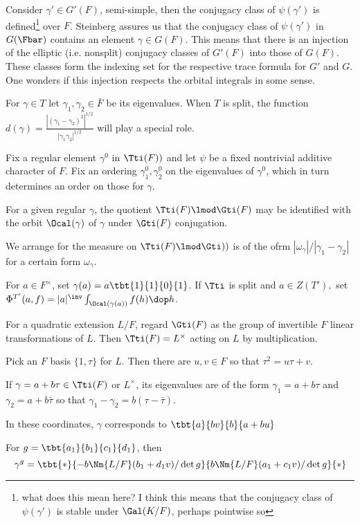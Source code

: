 Consider $\gamma' \in G'(F)$, semi-simple, then the conjugacy class of $\psi(\gamma')$ is defined\footnote{what does this mean here? I think this means that the conjugacy class of $\psi(\gamma')$ is stable under $\Gal(K/F)$, perhaps pointwise so}  over $F$. Steinberg assures us that the conjugacy class of $\psi(\gamma')$ in $G(\Fbar)$ contains an element $\gamma \in G(F)$. This means that there is an injection of the elliptic (i.e. nonsplit) conjugacy classes of $G'(F)$ into those of $G(F)$. These classes form the indexing set for the respective trace formula for $G'$ and $G$. One wonders if this injection respects the orbital integrals in some sense. 

For $\gamma \in T$ let $\gamma_1,\gamma_2 \in \bar{F}$ be its eigenvalues. When $T$ is split, the function $d(\gamma)= \frac{|(\gamma_1 -\gamma_2)^2|^{1/2}}{|\gamma_1\gamma_2|^{1/2}} $ will play a special role. 

Fix a regular element $\gamma^0$ in $\Tti(F))$ and let $\psi$ be a fixed nontrivial additive character of $F$. Fix an ordering $\gamma_1^0, \gamma_2^0$ on the eigenvalues of $\gamma^0$, which in turn determines an order on those for $\gamma$. 

For a given regular $\gamma$, the quotient $\Tti(F) \lmod \Gti(F)$ may be identified with the orbit $\Ocal(\gamma)$ of $\gamma$ under $\Gti(F)$ conjugation.

We arrange for the measure on $\Tti(F)\lmod \Gti))$ is of the ofrm $|\omega_\gamma |/|\gamma_1 - \gamma_2|$ for a certain form $\omega_\gamma$.

For $a\in F^\times$, set $\gamma(a) = a\tbt{1}{1}{0}{1}$. If $\Tti$ is split and $a\in Z(T'),$ set $\Phi^{T'}(a,f)= |a|^\inv \int_{\Ocal(\gamma(a))} f(h) \dop h$. 

For a quadratic extension $L/F$, regard $\Gti(F)$ as the group of invertible $F$ linear transformations of  $L$. Then $\Tti(F)= L^\times$ acting on $L$ by multiplication. 

Pick an $F$ basis $\{1,\tau\}$ for $L$. Then there are $u,v \in F$ so that $\tau^2 = u \tau +v$. 

If $\gamma = a+b\tau \in \Tti(F)$ or $L^\times$, its eigenvalues are of the form $\gamma_1=a+b\tau$ and $\gamma_2 = a+b \bar{\tau}$ so that $\gamma_1-\gamma_2  = b (\tau -\bar{\tau})$. 

In these coordinates, $\gamma$ corresponds to $\tbt{a}{bv}{b}{a+bu} $

For $g = \tbt{a_1}{b_1}{c_1}{d_1}$, then 
$$\gamma^g = \tbt{*}{-b \Nm{L/F}(b_1+d_1v)/\det g}{b \Nm{L/F}(a_1+c_1v)/\det g}{*}$$

